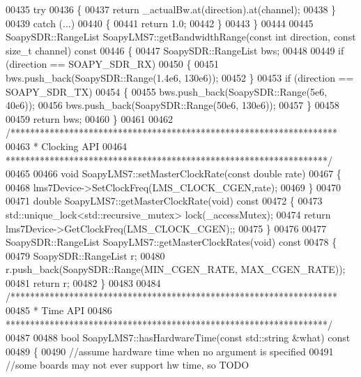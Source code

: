\begin{DoxyCode}
{{{{{{{{{{{{{{00435     \textcolor{keywordflow}{try}
00436     \{
00437         \textcolor{keywordflow}{return} _actualBw.at(direction).at(channel);
00438     \}
00439     \textcolor{keywordflow}{catch} (...)
00440     \{
00441         \textcolor{keywordflow}{return} 1.0;
00442     \}
00443 \}
00444 
00445 SoapySDR::RangeList SoapyLMS7::getBandwidthRange(\textcolor{keyword}{const} \textcolor{keywordtype}{int} direction, \textcolor{keyword}{const} \textcolor{keywordtype}{size\_t} channel)\textcolor{keyword}{ const}
00446 \textcolor{keyword}{}\{
00447     SoapySDR::RangeList bws;
00448 
00449     \textcolor{keywordflow}{if} (direction == SOAPY_SDR_RX)
00450     \{
00451         bws.push\_back(SoapySDR::Range(1.4e6, 130e6));
00452     \}
00453     \textcolor{keywordflow}{if} (direction == SOAPY_SDR_TX)
00454     \{
00455         bws.push\_back(SoapySDR::Range(5e6, 40e6));
00456         bws.push\_back(SoapySDR::Range(50e6, 130e6));
00457     \}
00458 
00459     \textcolor{keywordflow}{return} bws;
00460 \}
00461 
00462 \textcolor{comment}{/*******************************************************************}
00463 \textcolor{comment}{ * Clocking API}
00464 \textcolor{comment}{ ******************************************************************/}
00465 
00466 \textcolor{keywordtype}{void} SoapyLMS7::setMasterClockRate(\textcolor{keyword}{const} \textcolor{keywordtype}{double} rate)
00467 \{
00468     lms7Device->SetClockFreq(LMS_CLOCK_CGEN,rate);
00469 \}
00470 
00471 \textcolor{keywordtype}{double} SoapyLMS7::getMasterClockRate(\textcolor{keywordtype}{void})\textcolor{keyword}{ const}
00472 \textcolor{keyword}{}\{
00473     std::unique\_lock<std::recursive\_mutex> lock(_accessMutex);
00474     \textcolor{keywordflow}{return} lms7Device->GetClockFreq(LMS_CLOCK_CGEN);;
00475 \}
00476 
00477 SoapySDR::RangeList SoapyLMS7::getMasterClockRates(\textcolor{keywordtype}{void})\textcolor{keyword}{ const}
00478 \textcolor{keyword}{}\{
00479     SoapySDR::RangeList r;
00480     r.push\_back(SoapySDR::Range(MIN_CGEN_RATE, MAX_CGEN_RATE));
00481     \textcolor{keywordflow}{return} r;
00482 \}
00483 
00484 \textcolor{comment}{/*******************************************************************}
00485 \textcolor{comment}{ * Time API}
00486 \textcolor{comment}{ ******************************************************************/}
00487 
00488 \textcolor{keywordtype}{bool} SoapyLMS7::hasHardwareTime(\textcolor{keyword}{const} std::string &what)\textcolor{keyword}{ const}
00489 \textcolor{keyword}{}\{
00490     \textcolor{comment}{//assume hardware time when no argument is specified}
00491     \textcolor{comment}{//some boards may not ever support hw time, so TODO}
}}}}}}}}}}}}}}
\end{DoxyCode}
